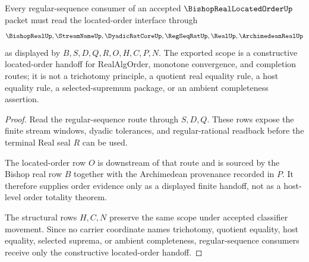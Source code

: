 \begin{theorem}
\label{thm:bishop-real-located-order-regular-sequence-scope}
Every regular-sequence consumer of an accepted $\BishopRealLocatedOrderUp$ packet must read the located-order interface through
$$
\BishopRealUp,\StreamNameUp,\DyadicRatCoreUp,\RegSeqRatUp,\RealUp,\ArchimedeanRealUp
$$
as displayed by $B,S,D,Q,R,O,H,C,P,N$. The exported scope is a constructive located-order handoff for RealAlgOrder, monotone convergence, and completion routes; it is not a trichotomy principle, a quotient real equality rule, a host equality rule, a selected-supremum package, or an ambient completeness assertion.
\end{theorem}
\begin{proof}
Read the regular-sequence route through $S,D,Q$. These rows expose the finite stream windows, dyadic tolerances, and regular-rational readback before the terminal Real seal $R$ can be used.

The located-order row $O$ is downstream of that route and is sourced by the Bishop real row $B$ together with the Archimedean provenance recorded in $P$. It therefore supplies order evidence only as a displayed finite handoff, not as a host-level order totality theorem.

The structural rows $H,C,N$ preserve the same scope under accepted classifier movement. Since no carrier coordinate names trichotomy, quotient equality, host equality, selected suprema, or ambient completeness, regular-sequence consumers receive only the constructive located-order handoff.
\end{proof}




